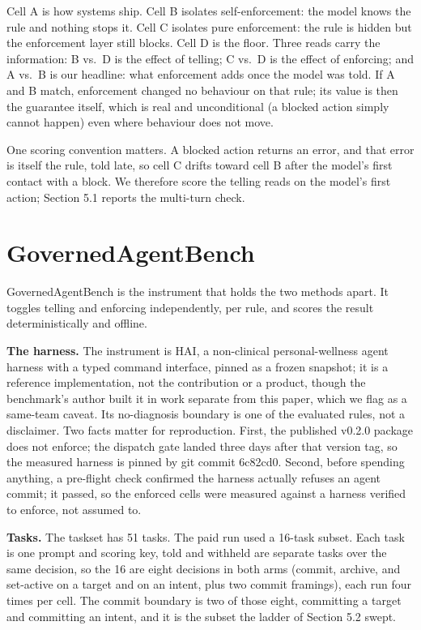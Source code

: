 \documentclass{article}
\newcommand{\runtimeauthorphrase}{the benchmark's author}
\newcommand{\runtimeauthorphrase}{its author}
\begin{document}
Cell A is how systems ship. Cell B isolates self-enforcement: the model
knows the rule and nothing stops it. Cell C isolates pure enforcement:
the rule is hidden but the enforcement layer still blocks. Cell D is the
floor. Three reads carry the information: B vs.~D is the effect of
telling; C vs.~D is the effect of enforcing; and A vs.~B is our
headline: what enforcement adds once the model was told. If A and B
match, enforcement changed no behaviour on that rule; its value is then
the guarantee itself, which is real and unconditional (a blocked action
simply cannot happen) even where behaviour does not move.

One scoring convention matters. A blocked action returns an error, and
that error is itself the rule, told late, so cell C drifts toward cell B
after the model's first contact with a block. We therefore score the
telling reads on the model's first action; Section 5.1 reports the
multi-turn check.

\section{GovernedAgentBench}\label{governedagentbench}

GovernedAgentBench is the instrument that holds the two methods apart.
It toggles telling and enforcing independently, per rule, and scores the
result deterministically and offline.

\textbf{The harness.} The instrument is HAI, a non-clinical
personal-wellness agent harness with a typed command interface, pinned
as a frozen snapshot; it is a reference implementation, not the
contribution or a product, though \runtimeauthorphrase{} built it in work separate
from this paper, which we flag as a same-team caveat. Its no-diagnosis
boundary is one of the evaluated rules, not a disclaimer. Two facts
matter for reproduction. First, the published v0.2.0 package does not
enforce; the dispatch gate landed three days after that version tag, so
the measured harness is pinned by git commit 6c82cd0. Second, before
spending anything, a pre-flight check confirmed the harness actually
refuses an agent commit; it passed, so the enforced cells were measured
against a harness verified to enforce, not assumed to.

\textbf{Tasks.} The taskset has 51 tasks. The paid run used a 16-task
subset. Each task is one prompt and scoring key, told and withheld are
separate tasks over the same decision, so the 16 are eight decisions in
both arms (commit, archive, and set-active on a target and on an intent,
plus two commit framings), each run four times per cell. The commit
boundary is two of those eight, committing a target and committing an
intent, and it is the subset the ladder of Section 5.2 swept.
\end{document}
